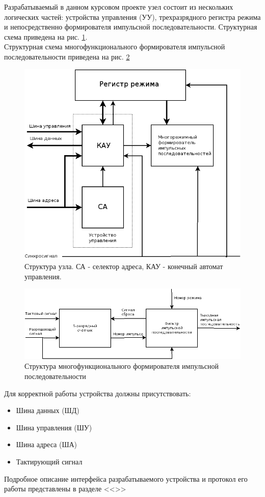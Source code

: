 Разрабатываемый в данном курсовом проекте узел состоит из нескольких логических частей: устройства управления (УУ), трехразрядного регистра режима и непосредственно формирователя импульсной последовательности. Структурная схема приведена на рис. \ref{fig:structure}.\\
Структурная схема многофункционального формирователя импульсной последовательности приведена на рис. \ref{fig:nodestructure}

\begin{figure}
  \includegraphics[scale=0.58]{./structure.png}
  \caption{Структура узла. СА - селектор адреса, КАУ - конечный автомат управления.}
  \label{fig:structure}
\end{figure}

\begin{figure}
  \includegraphics[scale=0.58]{./node-structure.png}
  \caption{Структура многофункционального формирователя импульсной последовательности}
  \label{fig:nodestructure}
\end{figure}

Для корректной работы устройства должны присутствовать:
\begin{itemize}
\item Шина данных (ШД)
\item Шина управления (ШУ)
\item Шина адреса (ША)
\item Тактирующий сигнал
\end{itemize}
\noindent Подробное описание интерфейса разрабатываемого устройства и протокол его работы представлены в разделе <<>>

